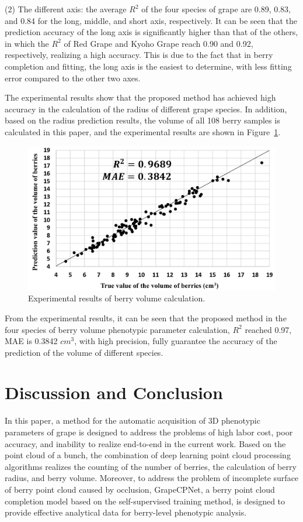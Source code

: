 \documentclass[12pt]{article}
\begin{document}
(2) The different axis: the average $R^2$ of the four species of grape are 0.89, 0.83, and 0.84 for the long, middle, and short axis, respectively. 
It can be seen that the prediction accuracy of the long axis is significantly higher than that of the others, in which the $R^2$ of Red Grape and Kyoho Grape reach 0.90 and 0.92, respectively, realizing a high accuracy. 
This is due to the fact that in berry completion and fitting, the long axis is the easiest to determine, with less fitting error compared to the other two axes.

The experimental results show that the proposed method has achieved high accuracy in the calculation of the radius of different grape species. 
In addition, based on the radius prediction results, the volume of all 108 berry samples is calculated in this paper, and the experimental results are shown in Figure~\ref{fig:raw18}.

\begin{figure}[hbt!]
    \centering
    \includegraphics[width=1\textwidth]{figures/Figure15.pdf}
    \caption{Experimental results of berry volume calculation.}
    \label{fig:raw18}
\end{figure}

From the experimental results, it can be seen that the proposed method in the four species of berry volume phenotypic parameter calculation, $R^2$ reached 0.97, MAE is 0.3842 $cm^3$, with high precision, fully guarantee the accuracy of the prediction of the volume of different species.

\section{Discussion and Conclusion}

In this paper, a method for the automatic acquisition of 3D phenotypic parameters of grape is designed to address the problems of high labor cost, poor accuracy, and inability to realize end-to-end in the current work. 
Based on the point cloud of a bunch, the combination of deep learning point cloud processing algorithms realizes the counting of the number of berries, the calculation of berry radius, and berry volume. 
Moreover, to address the problem of incomplete surface of berry point cloud caused by occlusion, GrapeCPNet, a berry point cloud completion model based on the self-supervised training method, is designed to provide effective analytical data for berry-level phenotypic analysis.
\end{document}
